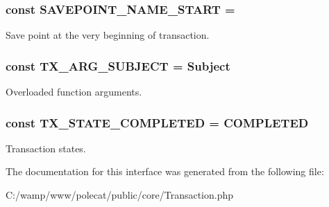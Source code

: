\subsubsection[{S\+A\+V\+E\+P\+O\+I\+N\+T\+\_\+\+N\+A\+M\+E\+\_\+\+S\+T\+A\+R\+T}]{\setlength{\rightskip}{0pt plus 5cm}const S\+A\+V\+E\+P\+O\+I\+N\+T\+\_\+\+N\+A\+M\+E\+\_\+\+S\+T\+A\+R\+T = \textquotesingle{}}\label{interface_able_polecat___transaction_interface_a04ed49890eb8b5b01df737c511037773}
Save point at the very beginning of transaction. \hypertarget{interface_able_polecat___transaction_interface_a726c4c2c8870ed3d97a4a758df3486fe}{}
\subsubsection[{T\+X\+\_\+\+A\+R\+G\+\_\+\+S\+U\+B\+J\+E\+C\+T}]{\setlength{\rightskip}{0pt plus 5cm}const T\+X\+\_\+\+A\+R\+G\+\_\+\+S\+U\+B\+J\+E\+C\+T = \textquotesingle{}Subject\textquotesingle{}}\label{interface_able_polecat___transaction_interface_a726c4c2c8870ed3d97a4a758df3486fe}
Overloaded function arguments. \hypertarget{interface_able_polecat___transaction_interface_abcfd87c8ccec5768bde1a9c8452d9c7f}{}
\subsubsection[{T\+X\+\_\+\+S\+T\+A\+T\+E\+\_\+\+C\+O\+M\+P\+L\+E\+T\+E\+D}]{\setlength{\rightskip}{0pt plus 5cm}const T\+X\+\_\+\+S\+T\+A\+T\+E\+\_\+\+C\+O\+M\+P\+L\+E\+T\+E\+D = \textquotesingle{}C\+O\+M\+P\+L\+E\+T\+E\+D\textquotesingle{}}\label{interface_able_polecat___transaction_interface_abcfd87c8ccec5768bde1a9c8452d9c7f}
Transaction states. 

The documentation for this interface was generated from the following file\+:\begin{DoxyCompactItemize}
\item 
C\+:/wamp/www/polecat/public/core/Transaction.\+php\end{DoxyCompactItemize}
